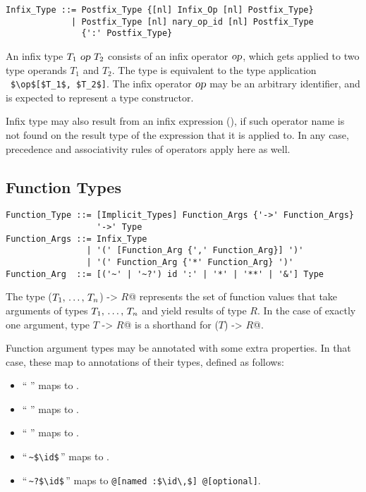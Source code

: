 \syntax\begin{lstlisting}
Infix_Type ::= Postfix_Type {[nl] Infix_Op [nl] Postfix_Type}
             | Postfix_Type [nl] nary_op_id [nl] Postfix_Type 
               {':' Postfix_Type}
\end{lstlisting}

An infix type $T_1\ \mbox{\sl op}\ T_2$ consists of an infix operator $\mbox{\sl op}$, which gets applied to two type operands $T_1$ and $T_2$. The type is equivalent to the type application ~\lstinline!$\op$[$T_1$, $T_2$]!. The infix operator $\mbox{\sl op}$ may be an arbitrary identifier, and is expected to represent a type constructor. 

Infix type may also result from an infix expression (), if such operator name is not found on the result type of the expression that it is applied to. In any case, precedence and associativity rules of operators apply here as well. 





\subsection{Function Types}
\label{sec:function-types}

\syntax\begin{lstlisting}
Function_Type ::= [Implicit_Types] Function_Args {'->' Function_Args}
                  '->' Type
Function_Args ::= Infix_Type
                | '(' [Function_Arg {',' Function_Arg}] ')'
                | '(' Function_Arg {'*' Function_Arg} ')'
Function_Arg  ::= [('~' | '~?') id ':' | '*' | '**' | '&'] Type
\end{lstlisting}

The type \lstinline@($T_1 ,\, \ldots ,\, T_n$) -> $R$@ represents the set of function values that take arguments of types $T_1 ,\, \ldots ,\, T_n$ and yield results of type $R$. In the case of exactly one argument, type \lstinline@$T$ -> $R$@ is a shorthand for \lstinline@($T$) -> $R$@. 

Function argument types may be annotated with some extra properties. In that case, these map to annotations of their types, defined as follows:
\begin{itemize}
\item ``\,\code{*}\,'' maps to . 
\item ``\,\code{**}\,'' maps to . 
\item ``\,\code{&}\,'' maps to . 
\item ``\,\lstinline!~$\id$!\,'' maps to . 
\item ``\,\lstinline!~?$\id$!\,'' maps to \lstinline[deletekeywords={optional}]!@[named :$\id\,$] @[optional]!. 
\end{itemize}

